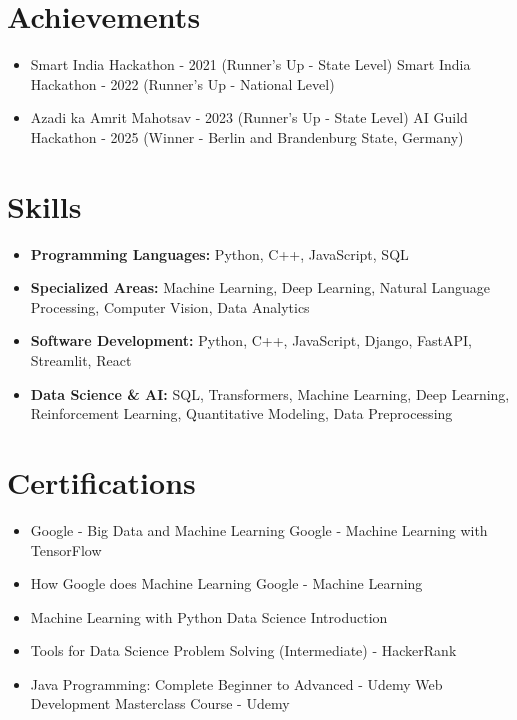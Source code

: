 \documentclass[a4paper,10pt]{article}
\begin{document}
\section*{Achievements}
\begin{itemize}
\item Smart India Hackathon - 2021 (Runner's Up - State Level) \hfill Smart India Hackathon - 2022 (Runner's Up - National Level)
\item Azadi ka Amrit Mahotsav - 2023 (Runner's Up - State Level) \hfill AI Guild Hackathon - 2025 (Winner - Berlin and Brandenburg State, Germany)
\end{itemize}

\section*{Skills}
\begin{itemize}
  \item \textbf{Programming Languages:} Python, C++, JavaScript, SQL
  \item \textbf{Specialized Areas:} Machine Learning, Deep Learning, Natural Language Processing, Computer Vision, Data Analytics
  \item \textbf{Software Development:} Python, C++, JavaScript, Django, FastAPI, Streamlit, React
  \item \textbf{Data Science \& AI:} SQL, Transformers, Machine Learning, Deep Learning, Reinforcement Learning, Quantitative Modeling, Data Preprocessing
\end{itemize}

\section*{Certifications}
\begin{itemize}
\item Google - Big Data and Machine Learning \hfill Google - Machine Learning with TensorFlow
\item How Google does Machine Learning \hfill Google - Machine Learning
\item Machine Learning with Python \hfill Data Science Introduction
\item Tools for Data Science \hfill Problem Solving (Intermediate) - HackerRank
\item Java Programming: Complete Beginner to Advanced - Udemy \hfill Web Development Masterclass Course - Udemy
\end{itemize}
\end{document}
